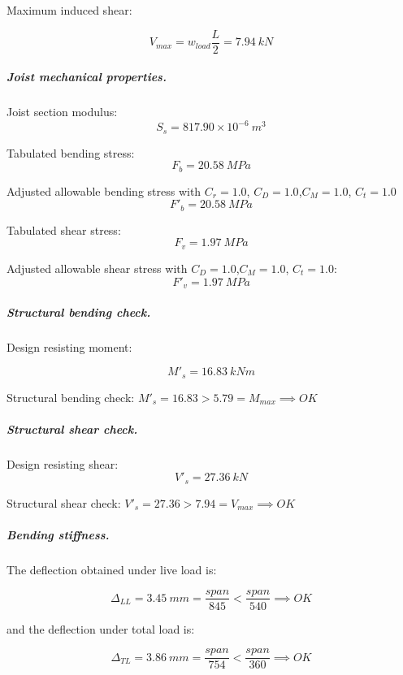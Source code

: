 \noindent Maximum induced shear:

\begin{equation}
  V_{max}= w_{load} \frac{L}{2}= 7.94\ kN
\end{equation}

\subparagraph{Joist mechanical properties.}

\noindent Joist section modulus:
\begin{equation}
  S_s= 817.90 \times 10^{-6}\ m^3
\end{equation}

\noindent Tabulated bending stress:
\begin{equation}
  F_b= 20.58\ MPa
\end{equation}


\noindent Adjusted allowable bending stress with $C_r= 1.0$, $C_D= 1.0$,$C_M= 1.0$, $C_t= 1.0$
\begin{equation}
  F'_b= 20.58\ MPa
\end{equation}

\noindent Tabulated shear stress:
\begin{equation}
  F_v= 1.97\ MPa
\end{equation}

\noindent Adjusted allowable shear stress with $C_D= 1.0$,$C_M= 1.0$, $C_t= 1.0$:
\begin{equation}
  F'_v= 1.97\ MPa
\end{equation}

\subparagraph{Structural bending check.}

\noindent Design resisting moment:

\begin{equation}
  M'_s= 16.83\ kN m
\end{equation}

\noindent Structural bending check: $M'_s = 16.83 > 5.79 = M_{max} \implies OK$

\subparagraph{Structural shear check.}

\noindent Design resisting shear:
\begin{equation}
  V'_s= 27.36\ kN
\end{equation}

\noindent Structural shear check: $V'_s = 27.36 > 7.94 = V_{max} \implies OK$

\subparagraph{Bending stiffness.}
The deflection obtained under live load is:

\begin{equation}
  \Delta_{LL}= 3.45\ mm= \frac{span}{845} < \frac{span}{540} \implies OK
\end{equation}

\noindent and the deflection under total load is:

\begin{equation}
  \Delta_{TL}= 3.86\ mm= \frac{span}{754} < \frac{span}{360} \implies OK
\end{equation}

